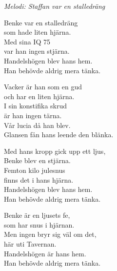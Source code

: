 {\footnotesize\textit{Melodi: Staffan var en stalledräng}}\par
\vspace{10pt}
Benke var en stalledräng\\
som hade liten hjärna.\\
Med sina IQ 75\\
var han ingen stjärna.\\
Handelshögen blev hans hem.\\
Han behövde aldrig mera tänka.\par
\vspace{10pt}
Vacker är han som en gud\\
och har en liten hjärna.\\
I sin konstifika skrud\\
är han ingen tärna.\\
Vår lucia då han blev.\\
Glansen fån hans leende den blänka.\par
\vspace{10pt}
Med hans kropp gick upp ett ljus,\\
Benke blev en stjärna.\\
Femton kilo julesnus\\
finns det i hans hjärna.\\
Handelshögen blev hans hem.\\
Han behövde aldrig mera tänka.\par
\vspace{10pt}
Benke är en ljusets fe,\\
som har snus i hjärnan.\\
Men ingen bryr sig väl om det,\\
här uti Tavernan.\\
Handelshögen är hans hem.\\
Han behövde aldrig mera tänka.
